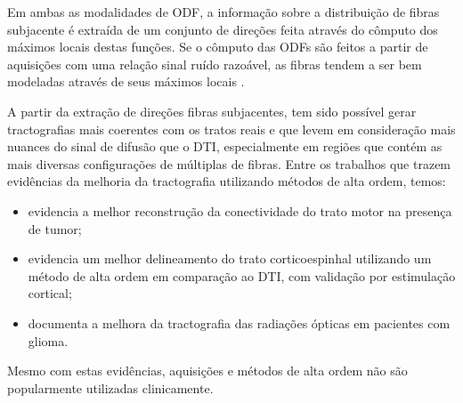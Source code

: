 \documentclass[
    12pt,                %
    oneside,            %
    a4paper,            %
    english,            %
    french,                %
    spanish,            %
    brazil                %
    ]{abntex2}
\begin{document}
Em ambas as modalidades de ODF, a informação sobre a distribuição de fibras subjacente é extraída de um conjunto de direções feita através do cômputo dos máximos locais destas funções. Se o cômputo das ODFs são feitos a partir de aquisições com uma relação sinal ruído razoável, as fibras tendem a ser bem modeladas através de seus máximos locais \cite{fillard2011}.


A partir da extração de direções fibras subjacentes, tem sido possível gerar tractografias mais coerentes com os tratos reais e que levem em consideração mais nuances do sinal de difusão que o DTI, especialmente em regiões que contém as mais diversas configurações de múltiplas de fibras. Entre os trabalhos que trazem evidências da melhoria da tractografia utilizando métodos de alta ordem, temos:

\begin{itemize}
    \item {} evidencia a melhor reconstrução da conectividade do trato motor na presença de tumor;
    \item {} evidencia um melhor delineamento do trato corticoespinhal utilizando um método de alta ordem em comparação ao DTI, com validação por estimulação cortical;
    \item {} documenta a melhora da tractografia das radiações ópticas em pacientes com glioma.
\end{itemize}
Mesmo com estas evidências, aquisições e métodos de alta ordem não são popularmente utilizadas clinicamente.


\end{document}
